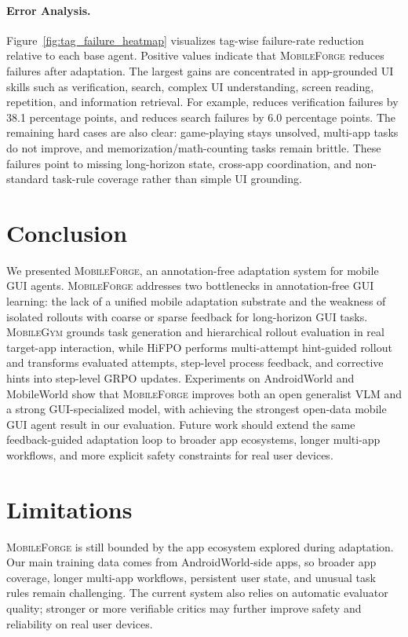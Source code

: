 \documentclass{llmxive}
\providecommand{\ourmethod}{\textsc{MobileForge}\xspace}
\providecommand{\mobilegym}{\textsc{MobileGym}\xspace}
\providecommand{\hifpo}{HiFPO\xspace}
\begin{document}
\paragraph{Error Analysis.}
Figure~\ref{fig:tag_failure_heatmap} visualizes tag-wise failure-rate reduction relative to each base agent. Positive values indicate that \ourmethod reduces failures after adaptation. The largest gains are concentrated in app-grounded UI skills such as verification, search, complex UI understanding, screen reading, repetition, and information retrieval. For example,  reduces verification failures by 38.1 percentage points, and  reduces search failures by 6.0 percentage points. The remaining hard cases are also clear: game-playing stays unsolved, multi-app tasks do not improve, and memorization/math-counting tasks remain brittle. These failures point to missing long-horizon state, cross-app coordination, and non-standard task-rule coverage rather than simple UI grounding.

\section{Conclusion}

We presented \ourmethod, an annotation-free adaptation system for mobile GUI agents. \ourmethod addresses two bottlenecks in annotation-free GUI learning: the lack of a unified mobile adaptation substrate and the weakness of isolated rollouts with coarse or sparse feedback for long-horizon GUI tasks. \mobilegym grounds task generation and hierarchical rollout evaluation in real target-app interaction, while \hifpo performs multi-attempt hint-guided rollout and transforms evaluated attempts, step-level process feedback, and corrective hints into step-level GRPO updates. Experiments on AndroidWorld and MobileWorld show that \ourmethod improves both an open generalist VLM and a strong GUI-specialized model, with  achieving the strongest open-data mobile GUI agent result in our evaluation. Future work should extend the same feedback-guided adaptation loop to broader app ecosystems, longer multi-app workflows, and more explicit safety constraints for real user devices.

\section{Limitations}

\ourmethod is still bounded by the app ecosystem explored during adaptation. Our main training data comes from AndroidWorld-side apps, so broader app coverage, longer multi-app workflows, persistent user state, and unusual task rules remain challenging. The current system also relies on automatic evaluator quality; stronger or more verifiable critics may further improve safety and reliability on real user devices.
\end{document}
